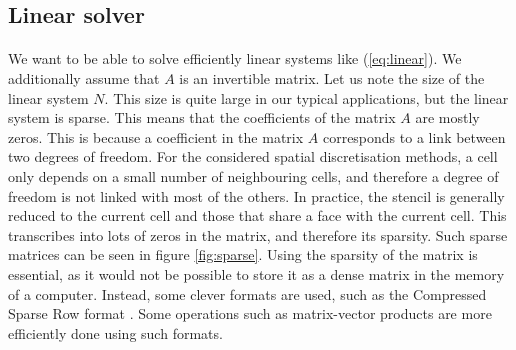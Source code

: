     \subsection{Linear solver}

      \paragraph{}
      We want to be able to solve efficiently linear systems like (\ref{eq:linear}).
      We additionally assume that $A$ is an invertible matrix.
      Let us note the size of the linear system $N$.
      This size is quite large in our typical applications, but the linear system is sparse.
      This means that the coefficients of the matrix $A$ are mostly zeros.
      This is because a coefficient in the matrix $A$ corresponds to a link between two degrees of freedom.
      For the considered spatial discretisation methods, a cell only depends on a small number of neighbouring cells, and therefore a degree of freedom is not linked with most of the others.
      In practice, the stencil is generally reduced to the current cell and those that share a face with the current cell.
      This transcribes into lots of zeros in the matrix, and therefore its sparsity.
      Such sparse matrices can be seen in figure \ref{fig:sparse}.
      Using the sparsity of the matrix is essential, as it would not be possible to store it as a dense matrix in the memory of a computer.
      Instead, some clever formats are used, such as the Compressed Sparse Row format \cite{Saad2003}.
      Some operations such as matrix-vector products are more efficiently done using such formats.

